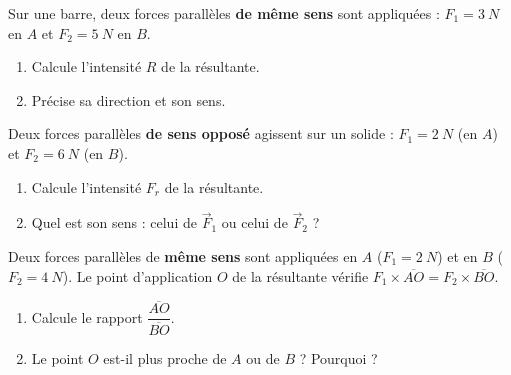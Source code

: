 \documentclass[11pt,a4paper]{article}
\newcommand{\vv}[1]{\vec{#1}}\newcommand{\ds}{\displaystyle}
\begin{document}
\begin{exo}
Sur une barre, deux forces parallèles \textbf{de même sens} sont appliquées : $F_1=\qty{3}{N}$ en $A$
et $F_2=\qty{5}{N}$ en $B$.
\begin{center}
\end{center}
\begin{enumerate}[label=\alph*)]
  \item Calcule l'intensité $R$ de la résultante.
  \item Précise sa direction et son sens.
\end{enumerate}
\end{exo}

\begin{exo}
Deux forces parallèles \textbf{de sens opposé} agissent sur un solide : $F_1=\qty{2}{N}$ (en $A$) et
$F_2=\qty{6}{N}$ (en $B$).
\begin{enumerate}[label=\alph*)]
  \item Calcule l'intensité $F_r$ de la résultante.
  \item Quel est son sens : celui de $\vv F_1$ ou celui de $\vv F_2$ ?
\end{enumerate}
\end{exo}

\begin{exo}
Deux forces parallèles de \textbf{même sens} sont appliquées en $A$ ($F_1=\qty{2}{N}$) et en $B$
($F_2=\qty{4}{N}$). Le point d'application $O$ de la résultante vérifie
$F_1\times\overline{AO}=F_2\times\overline{BO}$.
\begin{enumerate}[label=\alph*)]
  \item Calcule le rapport $\dfrac{\overline{AO}}{\overline{BO}}$.
  \item Le point $O$ est-il plus proche de $A$ ou de $B$ ? Pourquoi ?
\end{enumerate}
\end{exo}
\end{document}
